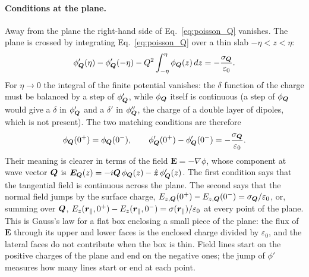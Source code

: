 \documentclass[10pt,a4paper]{paper}
\begin{document}
\paragraph{Conditions at the plane.} Away from the plane the right-hand side of Eq.~\eqref{eq:poisson_Q} vanishes.
The plane is crossed by integrating Eq.~\eqref{eq:poisson_Q} over a thin slab $-\eta < z < \eta$:
\begin{equation}
\phi'_{\bm{Q}}(\eta) - \phi'_{\bm{Q}}(-\eta) - Q^2\int_{-\eta}^{\eta}\phi_{\bm{Q}}(z)\,dz
= -\frac{\sigma_{\bm{Q}}}{\varepsilon_0} .
\end{equation}
For $\eta \to 0$ the integral of the finite potential vanishes: the $\delta$ function of the charge must be balanced
by a step of $\phi'_{\bm{Q}}$, while $\phi_{\bm{Q}}$ itself is continuous (a step of $\phi_{\bm{Q}}$ would give a $\delta$ in
$\phi'_{\bm{Q}}$ and a $\delta'$ in $\phi''_{\bm{Q}}$, the charge of a double layer of dipoles, which is not present). The
two matching conditions are therefore
\begin{equation}
\phi_{\bm{Q}}(0^+) = \phi_{\bm{Q}}(0^-) , \qquad
\phi'_{\bm{Q}}(0^+) - \phi'_{\bm{Q}}(0^-) = -\frac{\sigma_{\bm{Q}}}{\varepsilon_0} .
\label{eq:jump}
\end{equation}
Their meaning is clearer in terms of the field $\bm{E} = -\nabla\phi$, whose component at wave vector $\bm{Q}$ is
$\bm{E}_{\bm{Q}}(z) = -i\bm{Q}\,\phi_{\bm{Q}}(z) - \hat{\bm{z}}\,\phi'_{\bm{Q}}(z)$. The first condition says that the
tangential field is continuous across the plane. The second says that the normal field jumps by the surface charge,
$E_{z,\bm{Q}}(0^+) - E_{z,\bm{Q}}(0^-) = \sigma_{\bm{Q}}/\varepsilon_0$, or, summing over $\bm{Q}$,
$E_z(\bm{r}_{\parallel},0^+) - E_z(\bm{r}_{\parallel},0^-) = \sigma(\bm{r}_{\parallel})/\varepsilon_0$ at every point of the plane. This is Gauss's law for
a flat box enclosing a small piece of the plane: the flux of $\bm{E}$ through its upper and lower faces is the
enclosed charge divided by $\varepsilon_0$, and the lateral faces do not contribute when the box is thin. Field lines
start on the positive charges of the plane and end on the negative ones; the jump of $\phi'$ measures how many lines
start or end at each point.
\end{document}
